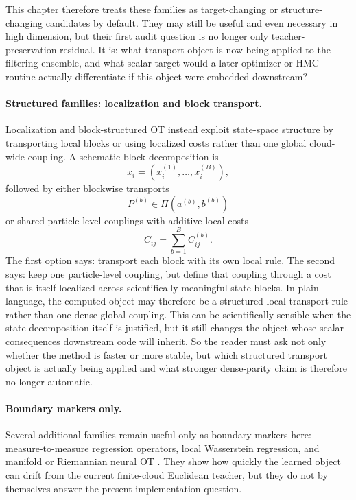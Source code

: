 This chapter therefore treats these families as target-changing or
structure-changing candidates by default.  They may still be useful and even
necessary in high dimension, but their first audit question is no longer only
teacher-preservation residual.  It is: what transport object is now being applied
to the filtering ensemble, and what scalar target would a later optimizer or HMC
routine actually differentiate if this object were embedded downstream?

\paragraph{Structured families: localization and block transport.}
Localization and block-structured OT instead exploit state-space structure by
transporting local blocks or using localized costs rather than one global cloud-
wide coupling.  A schematic block decomposition is
\begin{equation}
\label{eq:bf-neural-ot-dynamic-block-state}
  x_i=(x_i^{(1)},\ldots,x_i^{(B)}),
\end{equation}
followed by either blockwise transports
\begin{equation}
\label{eq:bf-neural-ot-dynamic-block-transport}
  P^{(b)}\in\Pi(a^{(b)},b^{(b)})
\end{equation}
or shared particle-level couplings with additive local costs
\begin{equation}
\label{eq:bf-neural-ot-dynamic-block-cost}
  C_{ij}
  =
  \sum_{b=1}^B C_{ij}^{(b)}.
\end{equation}
The first option says: transport each block with its own local rule.  The second
says: keep one particle-level coupling, but define that coupling through a cost
that is itself localized across scientifically meaningful state blocks.  In plain
language, the computed object may therefore be a structured local transport rule
rather than one dense global coupling.  This can be scientifically sensible when
the state decomposition itself is justified, but it still changes the object whose
scalar consequences downstream code will inherit.  So the reader must ask not only
whether the method is faster or more stable, but which structured transport object
is actually being applied and what stronger dense-parity claim is therefore no
longer automatic.

\paragraph{Boundary markers only.}
Several additional families remain useful only as boundary markers here:
measure-to-measure regression operators, local Wasserstein regression, and
manifold or Riemannian neural OT
\citep{vandergrift2026m2mtransformers,girshfeld2025nlwr,micheli2026rnot}.  They
show how quickly the learned object can drift from the current finite-cloud
Euclidean teacher, but they do not by themselves answer the present implementation
question.

